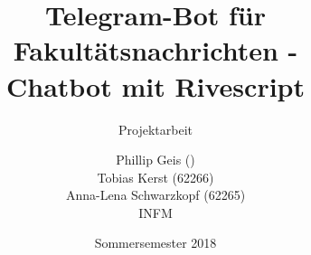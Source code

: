 \title{Telegram-Bot für Fakultätsnachrichten - \\ Chatbot mit Rivescript}%
\subtitle{Projektarbeit}
\author{%
  Phillip Geis () \\
	Tobias Kerst (62266) \\
  Anna-Lena Schwarzkopf (62265) \\
  INFM
}
\date{Sommersemester 2018}
\publishers{
    \textbf{Professor:} Prof. Dr. rer. nat. Peter A. Henning
}
\maketitle

\clearpage
